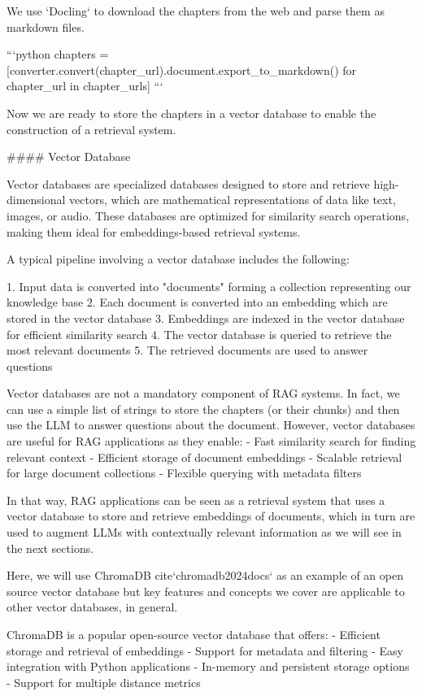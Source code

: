 {{We use `Docling` to download the chapters from the web and parse them as markdown files.


```python
chapters = [converter.convert(chapter_url).document.export_to_markdown() for chapter_url in chapter_urls]
```

Now we are ready to store the chapters in a vector database to enable the construction of a retrieval system.

#### Vector Database

Vector databases are specialized databases designed to store and retrieve high-dimensional vectors, which are mathematical representations of data like text, images, or audio. These databases are optimized for similarity search operations, making them ideal for embeddings-based retrieval systems.

A typical pipeline involving a vector database includes the following:

1. Input data is converted into "documents" forming a collection representing our knowledge base
2. Each document is converted into an embedding which are stored in the vector database
3. Embeddings are indexed in the vector database for efficient similarity search
4. The vector database is queried to retrieve the most relevant documents
5. The retrieved documents are used to answer questions

Vector databases are not a mandatory component of RAG systems. In fact, we can use a simple list of strings to store the chapters (or their chunks) and then use the LLM to answer questions about the document. However, vector databases are useful for RAG applications as they enable:
- Fast similarity search for finding relevant context
- Efficient storage of document embeddings
- Scalable retrieval for large document collections
- Flexible querying with metadata filters

In that way, RAG applications can be seen as a retrieval system that uses a vector database to store and retrieve embeddings of documents, which in turn are used to augment LLMs with contextually relevant information as we will see in the next sections.

Here, we will use ChromaDB {cite}`chromadb2024docs` as an example of an open source vector database but key features and concepts we cover are applicable to other vector databases, in general.

ChromaDB is a popular open-source vector database that offers:
- Efficient storage and retrieval of embeddings
- Support for metadata and filtering
- Easy integration with Python applications
- In-memory and persistent storage options
- Support for multiple distance metrics

}}
